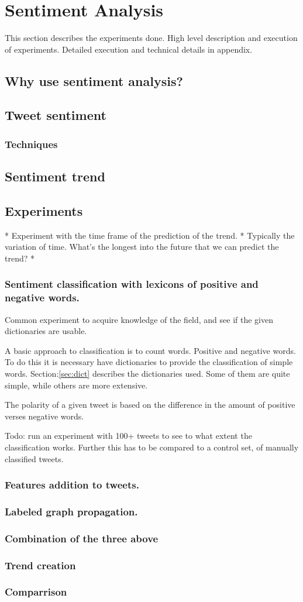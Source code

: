 
\chapter{Sentiment Analysis}
This section describes the experiments done. High level description and
execution of experiments. Detailed execution and technical details in appendix. 

\section{Why use sentiment analysis?}
\section{Tweet sentiment}
\subsection{Techniques}
\section{Sentiment trend}
\section{Experiments}

* Experiment with the time frame of the prediction of the trend. 
	* Typically the variation of time. What's the longest into the future that
we can predict the trend?
* 

\subsection{Sentiment classification with lexicons of positive and
negative words.}
Common experiment to acquire knowledge of the field, and see if the given
dictionaries are usable. 

A basic approach to classification is to count words. Positive and negative
words. To do this it is necessary have dictionaries to provide the
classification of simple words. Section:\ref{sec:dict} describes the
dictionaries used. Some of them are quite simple, while others are more
extensive. 

The polarity of a given tweet is based on the difference in the amount of
positive verses negative words. 

Todo: run an experiment with 100+ tweets to see to what extent the
classification works. Further this has to be compared to a control set, of
manually classified tweets.  

\subsection{Features addition to tweets.}
\subsection{Labeled graph propagation.}
\subsection{Combination of the three above}
\subsection{Trend creation}
\subsection{Comparrison}

